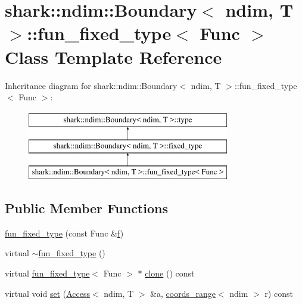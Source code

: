 \hypertarget{classshark_1_1ndim_1_1_boundary_1_1fun__fixed__type}{}\section{shark\+:\+:ndim\+:\+:Boundary$<$ ndim, T $>$\+:\+:fun\+\_\+fixed\+\_\+type$<$ Func $>$ Class Template Reference}
\label{classshark_1_1ndim_1_1_boundary_1_1fun__fixed__type}
Inheritance diagram for shark\+:\+:ndim\+:\+:Boundary$<$ ndim, T $>$\+:\+:fun\+\_\+fixed\+\_\+type$<$ Func $>$\+:\begin{figure}[H]
\begin{center}
\leavevmode
\includegraphics[height=3.000000cm]{classshark_1_1ndim_1_1_boundary_1_1fun__fixed__type}
\end{center}
\end{figure}
\subsection*{Public Member Functions}
\begin{DoxyCompactItemize}
\item 
\hyperlink{classshark_1_1ndim_1_1_boundary_1_1fun__fixed__type_a90a285a78f698d32d080910c0748ecc0}{fun\+\_\+fixed\+\_\+type} (const Func \&\hyperlink{classshark_1_1ndim_1_1_boundary_1_1fun__fixed__type_a968985106f368116b458500c16c4476f}{f})
\item 
virtual \hyperlink{classshark_1_1ndim_1_1_boundary_1_1fun__fixed__type_ae72b49516804b9d47bdc29917d7249bf}{$\sim$fun\+\_\+fixed\+\_\+type} ()
\item 
virtual \hyperlink{classshark_1_1ndim_1_1_boundary_1_1fun__fixed__type}{fun\+\_\+fixed\+\_\+type}$<$ Func $>$ $\ast$ \hyperlink{classshark_1_1ndim_1_1_boundary_1_1fun__fixed__type_a54ad8e702f2f3ff9403d43bfb7b38411}{clone} () const
\item 
virtual void \hyperlink{classshark_1_1ndim_1_1_boundary_1_1fun__fixed__type_adc9d38ff40b75decf5790ad6f701f3ad}{set} (\hyperlink{classshark_1_1ndim_1_1_access}{Access}$<$ ndim, T $>$ \&a, \hyperlink{structshark_1_1ndim_1_1coords__range}{coords\+\_\+range}$<$ ndim $>$ r) const
\end{DoxyCompactItemize}
